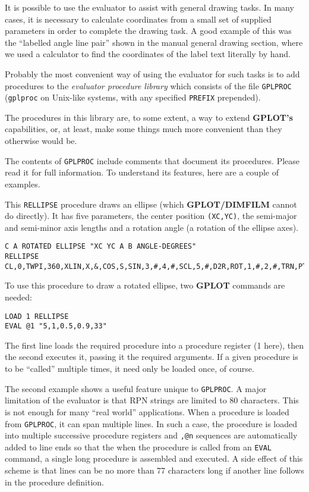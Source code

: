 \documentclass[a4paper,twoside,11pt]{article}
\newcommand{\newpara}{\par\vspace{4mm}\noindent}
\begin{document}
\newpara
It is possible to use the evaluator to assist with general drawing
tasks. In many cases, it is necessary to calculate coordinates from a
small set of supplied parameters in order to complete the drawing task.
A good example of this was the ``labelled angle line pair'' shown in the
manual general drawing section, where we used a calculator to find the
coordinates of the label text literally by hand.

\newpara
Probably the most convenient way of using the evaluator for such tasks
is to add procedures to the \emph{evaluator procedure library} which
consists of the file \texttt{GPLPROC} (\texttt{gplproc} on Unix-like
systems, with any specified \texttt{PREFIX} prepended).

\newpara
The procedures in this library are, to some extent, a way to extend
\textbf{GPLOT's} capabilities, or, at least, make some things much more
convenient than they otherwise would be.

\newpara
The contents of \texttt{GPLPROC} include comments that document its
procedures. Please read it for full information. To understand its
features, here are a couple of examples.

\newpara
This \texttt{RELLIPSE} procedure draws an ellipse (which \textbf{GPLOT/DIMFILM}
cannot do directly). It has five parameters, the center position
\texttt{(XC,YC)}, the semi-major and semi-minor axis lengths and a
rotation angle (a rotation of the ellipse axes).

\begin{lstlisting}
C A ROTATED ELLIPSE "XC YC A B ANGLE-DEGREES"
RELLIPSE
CL,0,TWPI,360,XLIN,X,&,COS,S,SIN,3,#,4,#,SCL,5,#,D2R,ROT,1,#,2,#,TRN,PTHC
\end{lstlisting}

\newpara
To use this procedure to draw a rotated ellipse, two \textbf{GPLOT} commands are
needed:

\begin{lstlisting}
LOAD 1 RELLIPSE
EVAL @1 "5,1,0.5,0.9,33"
\end{lstlisting}

\newpara
The first line loads the required procedure into a procedure register (1
here), then the second executes it, passing it the required arguments.
If a given procedure is to be ``called'' multiple times, it need only be
loaded once, of course.

\newpara
The second example shows a useful feature unique to \texttt{GPLPROC}. A
major limitation of the evaluator is that RPN strings are limited to 80
characters. This is not enough for many ``real world'' applications.
When a procedure is loaded from \texttt{GPLPROC}, it can span multiple
lines. In such a case, the procedure is loaded into multiple successive
procedure registers and \texttt{,@n} sequences are automatically added
to line ends so that the when the procedure is called from an
\texttt{EVAL} command, a single long procedure is assembled and
executed. A side effect of this scheme is that lines can be no more than
77 characters long if another line follows in the procedure definition.
\end{document}
